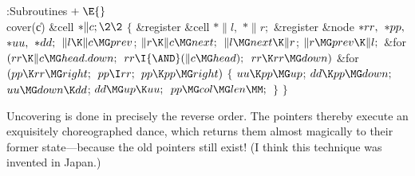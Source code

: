 \Y\B\4:Subroutines\X${}\mathrel+\E{}$\6
\\{cover}(\|c)\1\1\6
\&{cell} ${}{*}\|c;\2\2{}$\6
${}\{{}$\5
\1\&{register} \&{cell} ${}{*}\|l,{}$ ${}{*}\|r;{}$\6
\&{register} \&{node} ${}{*}\\{rr},{}$ ${}{*}\\{pp},{}$ ${}{*}\\{uu},{}$ ${}{*}%
\\{dd};{}$\7
${}\|l\K\|c\MG\\{prev}{}$;\5
${}\|r\K\|c\MG\\{next};{}$\6
${}\|l\MG\\{next}\K\|r{}$;\5
${}\|r\MG\\{prev}\K\|l;{}$\6
\&{for} ${}(\\{rr}\K\|c\MG\\{head}.\\{down};{}$ ${}\\{rr}\I{\AND}(\|c\MG%
\\{head});{}$ ${}\\{rr}\K\\{rr}\MG\\{down}){}$\1\6
\&{for} ${}(\\{pp}\K\\{rr}\MG\\{right};{}$ ${}\\{pp}\I\\{rr};{}$ ${}\\{pp}\K%
\\{pp}\MG\\{right}){}$\5
${}\{{}$\1\6
${}\\{uu}\K\\{pp}\MG\\{up}{}$;\5
${}\\{dd}\K\\{pp}\MG\\{down};{}$\6
${}\\{uu}\MG\\{down}\K\\{dd}{}$;\5
${}\\{dd}\MG\\{up}\K\\{uu};{}$\6
${}\\{pp}\MG\\{col}\MG\\{len}\MM;{}$\6
\4${}\}{}$\2\2\6
\4${}\}{}$\2\par
\fi

Uncovering is done in precisely the reverse order. The pointers thereby
execute an exquisitely choreo\-graphed dance, which returns them almost
magically to their former state---because the old pointers still exist!
(I think this technique was invented in Japan.)

